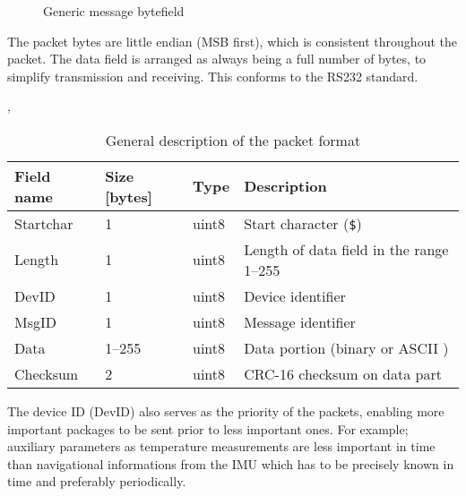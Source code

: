 \begin{figure}[h]
\centering
{}
\caption{Generic message bytefield}
\label{fig:bytefield}
\end{figure}


The packet bytes are little endian (MSB first), which is consistent throughout the packet. The data field is arranged as always being a full number of bytes, to simplify transmission and receiving. This conforms to the RS232 standard.

\begin{table}[h],
	\centering
	\begin{tabular}{llll}
		\toprule
		\textbf{Field name} & \textbf{Size [bytes]} & \textbf{Type} & \textbf{Description}\\
		\midrule
		Startchar & 1 & uint8 & Start character (\texttt{\$}) \\
		Length & 1 & uint8 & Length of data field in the range 1--255\\
		DevID & 1 & uint8 & Device identifier \\
		MsgID & 1 & uint8 & Message identifier \\
		Data & 1--255 & uint8 & Data portion (binary or ASCII )\\
		Checksum & 2 & uint8 & CRC-16 checksum on data part \\

		\bottomrule
	\end{tabular}
	\caption{General description of the packet format}
	\label{tab:general}
\end{table}

The device ID (DevID) also serves as the priority of the packets, enabling more important packages to be sent prior to less important ones. For example; auxiliary parameters as temperature measurements are less important in time than navigational informations from the \ac{IMU} which has to be precisely known in time and preferably periodically.

